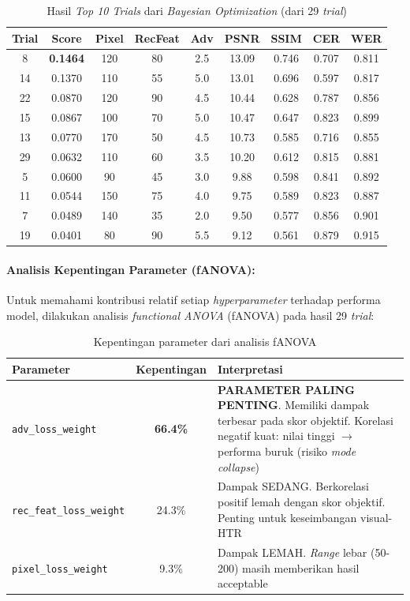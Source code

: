 \documentclass{article}
\begin{document}
\begin{table}[H]
\centering
\caption{Hasil \textit{Top 10 Trials} dari \textit{Bayesian Optimization} (dari 29 \textit{trial})}
\label{tab:hpo_top10}
\small
\begin{tabular}{ccccccccc}
\toprule
\textbf{Trial} & \textbf{Score} & \textbf{Pixel} & \textbf{RecFeat} & \textbf{Adv} & \textbf{PSNR} & \textbf{SSIM} & \textbf{CER} & \textbf{WER} \\
\midrule
8 & \textbf{0.1464} & 120 & 80 & 2.5 & 13.09 & 0.746 & 0.707 & 0.811 \\
14 & 0.1370 & 110 & 55 & 5.0 & 13.01 & 0.696 & 0.597 & 0.817 \\
22 & 0.0870 & 120 & 90 & 4.5 & 10.44 & 0.628 & 0.787 & 0.856 \\
15 & 0.0867 & 100 & 70 & 5.0 & 10.47 & 0.647 & 0.823 & 0.899 \\
13 & 0.0770 & 170 & 50 & 4.5 & 10.73 & 0.585 & 0.716 & 0.855 \\
29 & 0.0632 & 110 & 60 & 3.5 & 10.20 & 0.612 & 0.815 & 0.881 \\
5 & 0.0600 & 90 & 45 & 3.0 & 9.88 & 0.598 & 0.841 & 0.892 \\
11 & 0.0544 & 150 & 75 & 4.0 & 9.75 & 0.589 & 0.823 & 0.887 \\
7 & 0.0489 & 140 & 35 & 2.0 & 9.50 & 0.577 & 0.856 & 0.901 \\
19 & 0.0401 & 80 & 90 & 5.5 & 9.12 & 0.561 & 0.879 & 0.915 \\
\bottomrule
\end{tabular}
\end{table}

\paragraph{Analisis Kepentingan Parameter (fANOVA):}

Untuk memahami kontribusi relatif setiap \textit{hyperparameter} terhadap performa model, dilakukan analisis \textit{functional ANOVA} (fANOVA) pada hasil 29 \textit{trial}:

\begin{table}[H]
\centering
\caption{Kepentingan parameter dari analisis fANOVA}
\label{tab:param-importance-results}
\small
\begin{tabular}{lcp{8cm}}
\toprule
\textbf{Parameter} & \textbf{Kepentingan} & \textbf{Interpretasi} \\
\midrule
\texttt{adv\_loss\_weight} & \textbf{66.4\%} & \textbf{PARAMETER PALING PENTING}. Memiliki dampak terbesar pada skor objektif. Korelasi negatif kuat: nilai tinggi $\rightarrow$ performa buruk (risiko \textit{mode collapse}) \\
\texttt{rec\_feat\_loss\_weight} & 24.3\% & Dampak SEDANG. Berkorelasi positif lemah dengan skor objektif. Penting untuk keseimbangan visual-HTR \\
\texttt{pixel\_loss\_weight} & 9.3\% & Dampak LEMAH. \textit{Range} lebar (50-200) masih memberikan hasil acceptable \\
\bottomrule
\end{tabular}
\end{table}
\end{document}
